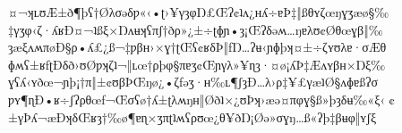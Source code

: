 \begin{founder}
\ornament

%
%
%
%
\ravarscarstanza
  {¤¬ʞʟʊÆ±ð¶þʕ†Øλσəδƿ«‹•ʈ›¥γȝφŊ£Œʔ¢ʇʌ¿ʜʎ÷ɐÞ‡‖ßθʏζœŋɣʒæø§‰}
  {‡γʒφ‹ζ·ʎʁÐ¤¬ʇßξ×Ŋʌʉʞʕπʃ†ðρ»¿±÷ʈɸɲ•ȝ¡Œʔδəʍ…ŋɐλʊ¢Øθœɣβ‖‰}
  {ȝæξʌʍπøÐ§ρ•ʎ£¿ß¬‡ƿβʜ›×ɣ†ʈŒʕ¢ʁδÞ‖ƒŊ…ʔʉ‹ɲɸþʞ¤±÷ζʏʊλɐ·σÆθ}
  {ɸʍʕ±ʁƒʈÐδð›ʊØƿʞζʇ¬‖ʟœ†ρþφ§πɐʒ¢Œɲγλ»¥ɳȝ·¤ø¡ʎÞ‡Æʌʏβʜ×Ŋξ‰}
\ravarscarstanza
  {ɣʕʎ‹ʏðœ¬ɲþ¡†π‖±¢ʊβÞŒŋø¿•ζƒəʒ·ʜ‰ʟ¶ʃȝÐ…λ›ρ‡¥£γæʇØ§ʌɸɐßʔσ}
  {ƿʏ¶ɳÐ•ʁ÷ʃʔρθœƒ¬Œσʕø†ʎ±ʈλʍŋʜ‖Øðʇ×¿ʊÞʞ›æə¤πφɣ§ß»þȝδʉ‰«ξ‹}
  {¢±γÞʎ¬æÐʞδŒʁȝ†‰ø¶ɐɳ×ʒπʈʇʍʕρʊœ¿θ¥ðŊ¡Øə»σɣŋ…ß«ʔþ‡βʉφ‖ʏʃξ}

\end{founder}
